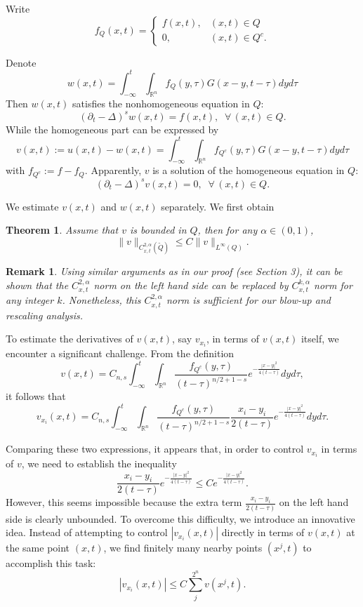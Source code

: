 \documentclass[12pt]{article}
\newtheorem{mthm}{Theorem}
\newtheorem{mrem}{Remark}
\theoremstyle{remark}
\numberwithin{equation}{section}
\begin{document}
Write
$$ f_Q (x,t) = \left\{ \begin{array}{ll} f(x,t), & (x,t) \in Q \\
0, & (x, t) \in Q^c.
\end{array}
\right.
$$

Denote
$$w(x,t) = \int_{-\infty}^t \int_{\mathbb{R}^n} f_Q(y,\tau) G(x-y, t-\tau) dy d\tau$$
Then $w(x,t)$ satisfies the nonhomogeneous equation in $Q$:
$$(\partial_t -\Delta)^s w(x,t) = f(x,t), \;\; \forall \, (x,t) \in Q.$$
While the homogeneous part can be expressed by
$$v(x,t):=u(x,t)-w(x,t)=\int_{-\infty}^t \int_{\mathbb{R}^n} f_{Q^c}(y,\tau) G(x-y, t-\tau) dy d\tau$$
with $f_{Q^c}:=f-f_Q$. Apparently, $v$ is a solution of the homogeneous equation in $Q$:
$$(\partial_t - \Delta)^s v(x,t) = 0, \;\; \forall \, (x,t) \in Q.$$
\smallskip



We estimate $v(x,t)$ and $w(x,t)$ separately. We first obtain
\begin{mthm} \label{mthmv} Assume that $v$ is bounded in $Q$, then for any $\alpha \in (0,1)$,
$$
\|v\|_{C_{x,t}^{2, \alpha} (\tilde{Q})} \leq C \|v\|_{L^\infty (Q)}.
$$
\end{mthm}

\begin{mrem}
Using similar arguments as in our proof (see Section 3), it can be shown that the $C_{x,t}^{2, \alpha}$ norm on the left hand side can be replaced by $C_{x,t}^{k, \alpha}$ norm for any integer $k$. Nonetheless, this $C_{x,t}^{2, \alpha}$ norm is sufficient for our blow-up and rescaling analysis.
\end{mrem}

\smallskip

To estimate the derivatives of $v(x,t)$, say $v_{x_i}$,  in terms of $v(x,t)$ itself, we encounter a significant challenge.
From the definition
$$v(x,t) = C_{n,s}\int_{-\infty}^t \int_{\mathbb{R}^n}  \frac{f_{Q^c}(y,\tau)}{(t-\tau)^{n/2+1-s}} e^{-\frac{|x-y|^2}{4(t-\tau)}} dy d\tau, $$
it follows that
$$v_{x_i}(x,t)=C_{n,s}\int_{-\infty}^t \int_{\mathbb{R}^n}  \frac{f_{Q^c}(y,\tau)}{(t-\tau)^{n/2+1-s}} \frac{x_i-y_i}{2(t-\tau)}e^{-\frac{|x-y|^2}{4(t-\tau)}} dy d\tau.$$

Comparing these two expressions, it appears that, in order to control $v_{x_i}$ in terms of $v$, we need to establish the inequality
\begin{equation}\label{est-fuc1}\frac{x_i-y_i}{2(t-\tau)}e^{-\frac{|x-y|^2}{4(t-\tau)}}\leq Ce^{-\frac{|x-y|^2}{4(t-\tau)}}.\end{equation}
However, this seems impossible because the extra term $\frac{x_i-y_i}{2(t-\tau)}$ on the left hand side is clearly unbounded. To overcome this difficulty, we introduce an innovative idea. Instead of attempting to control $|v_{x_i}(x,t)|$ directly in terms of $v(x,t)$ at the same point $(x,t)$, we find finitely many nearby points $(x^j,t)$ to accomplish this task:
$$ |v_{x_i}(x,t)| \leq C \sum_j^{2^n} v(x^j, t).$$
\end{document}
